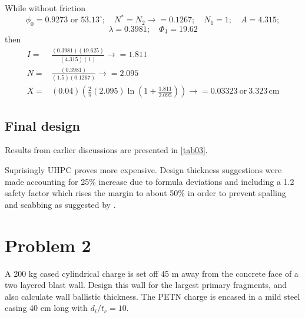 \documentclass[]{article} %
\begin{document}
While without friction
$$  \phi_0=0.9273 \text { or } 53.13^{\circ} ; \quad N^*=N_2 \rightarrow=0.1267 ; \quad N_1=1 ; \quad A=4.315 ; $$
$$  \lambda=0.3981 ; \quad \Phi_{\mathrm{J}}=19.62$$
then
\begin{equation}\nonumber
\begin{aligned}
I=&\frac{(0.3981)(19.625)}{(4.315)(1)}\rightarrow=1.811\\
N=&\frac{(0.3981)}{(1.5)(0.1267)}\rightarrow=2.095\\
X=&(0.04)\left(\frac{2}{\pi}(2.095)\ln{\left(1+\frac{1.811}{2.095}\right)}\right)\rightarrow=0.03323 ~ \mathrm{or}~ 3.323\,\mathrm{cm}
\end{aligned}
\end{equation}
\subsection*{Final design}
Results from earlier discussions are presented in \cref{tab03}.

\begin{table}
    \caption{Summary of results and costs based on \cref{tab02}.}
\label{tab03}
\end{table}

Suprisingly UHPC proves more expensive. Design thickness suggestions were made accounting for 25\% increase due to formula deviations and including a 1.2 safety factor which rises the margin to about 50\% in order to prevent spalling and scabbing as suggested by \cite{krauthammer2008modern}.

\section*{Problem 2}
A 200 kg cased cylindrical charge is set off 45 m away from the concrete face of a two layered blast wall. Design this wall for the largest primary fragments, and also calculate wall ballistic thickness. The PETN charge is encased in a mild steel casing 40 cm long with $d_i/t_c=10$.
\end{document}

